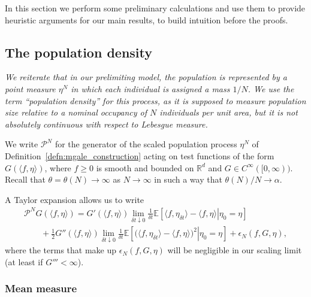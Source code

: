 \documentclass[EJP]{ejpecp} %
\newcommand{\IE}{\mathbb E}
\newcommand{\IR}{\mathbb R}
\newcommand{\Pgen}{\mathcal{P}}    %
\begin{document}
In this section we perform some preliminary calculations and use them 
to provide heuristic arguments for our main results,
to build intuition before the proofs.

\subsection{The population density}
    \label{sec:population_heuristics}

{\em We reiterate that in our prelimiting model,
the population is represented by a point measure $\eta^N$ in which each
individual is assigned a mass $1/N$. We use the term ``population density'' for
this process, as it is supposed to measure population size relative to a 
nominal occupancy of $N$ individuals per unit area, but it is not
absolutely continuous with respect to Lebesgue measure.}

We write $\Pgen^N$
for the generator of the scaled population process $\eta^N$
of Definition~\ref{defn:mgale_construction}
acting on test functions of the form $G( \langle f, \eta \rangle )$,
where $f \geq 0$ is smooth and bounded on $\IR^d$ and 
$G \in C^\infty ([0,\infty))$.
Recall that $\theta =\theta(N) \to \infty$ as $N\to\infty$ in such 
a way that $\theta(N)/N\to\alpha$.

A Taylor expansion allows us to write
\begin{multline}
	\label{generator prelimit}
    \Pgen^N
    G(\langle f,\eta \rangle)
    =
    G'(\langle f, \eta \rangle)
    \lim_{\delta t\downarrow 0} \frac{1}{\delta t}
    \IE\left[
        \left. \langle f, \eta_{\delta t} \rangle
        -
        \langle f, \eta \rangle
        \right| \eta_0=\eta
    \right]
    \\
    \qquad {}
    + \frac{1}{2}
        G''(\langle f,\eta\rangle)
    \lim_{\delta t\downarrow 0}\frac{1}{\delta t}
    \IE\left[
        \left.\big(\langle f,\eta_{\delta t}\rangle
        -
        \langle f, \eta\rangle\big)^2 \right|\eta_0=\eta
    \right]
    +
    \epsilon_N(f, G, \eta),
\end{multline}
where the terms that make up 
$\epsilon_N(f, G, \eta)$
will be negligible in our scaling limit (at least if $G'''<\infty$). 

\subsubsection*{Mean measure}
\end{document}
